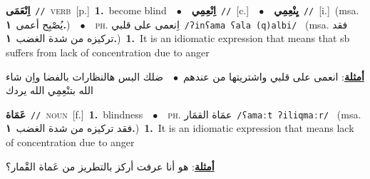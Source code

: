 \documentclass[10pt,a4paper,twoside]{article} %
\begin{document}
\begin{multicols}{2}
{\setlength\topsep{0pt}\textbf{\foreignlanguage{arabic}{اِنْعَمَى}}\ {\color{gray}\texttt{//}\color{black}}\ \textsc{verb}\ [p.]\ \textbf{1.}~become blind\ \ $\bullet$\ \ \setlength\topsep{0pt}\textbf{\foreignlanguage{arabic}{اِنْعِمِي}}\ {\color{gray}\texttt{//}\color{black}}\ [c.]\ \ $\bullet$\ \ \setlength\topsep{0pt}\textbf{\foreignlanguage{arabic}{يِنْعِمِي}}\ {\color{gray}\texttt{//}\color{black}}\ [i.]\ \color{gray}(msa. \foreignlanguage{arabic}{يُصْبِح أعمى}~\foreignlanguage{arabic}{\textbf{١.}})\color{black}\ \ $\bullet$\ \ \textsc{ph.} \color{gray} \foreignlanguage{arabic}{اِنعمى على قلبي}\color{black}\ {\color{gray}\texttt{/{\sffamily ʔinʕama ʕala (q)albi}/}\color{black}}\ \color{gray} (msa. \foreignlanguage{arabic}{فقد تركيزه من شدة الغضب}~\foreignlanguage{arabic}{\textbf{١.}})\color{black}\ \textbf{1.}~It is an idiomatic expression that means that sb suffers from lack of concentration due to anger\  \begin{flushright}\color{gray}\foreignlanguage{arabic}{\textbf{\underline{\foreignlanguage{arabic}{أمثلة}}}: انعمى على قلبي واشتريتها من عندهم\ $\bullet$\ \  ضلك البس هالنظارات بالفضا واِن شاء الله بتنْعِمِي الله يردك}\end{flushright}\color{black}} \vspace{2mm}

{\setlength\topsep{0pt}\textbf{\foreignlanguage{arabic}{عَمَاة}}\ {\color{gray}\texttt{//}\color{black}}\ \textsc{noun}\ [f.]\ \textbf{1.}~blindness\ \ $\bullet$\ \ \textsc{ph.} \color{gray} \foreignlanguage{arabic}{عمَاة القمَار}\color{black}\ {\color{gray}\texttt{/{\sffamily ʕamaːt ʔiliqmaːr}/}\color{black}}\ \color{gray} (msa. \foreignlanguage{arabic}{فقد تركيزه من شدة الغضب}~\foreignlanguage{arabic}{\textbf{١.}})\color{black}\ \textbf{1.}~It is an idiomatic expression that means lack of concentration due to anger\  \begin{flushright}\color{gray}\foreignlanguage{arabic}{\textbf{\underline{\foreignlanguage{arabic}{أمثلة}}}: هو أنا عرفت أركز بالتطريز من عَماة القْمار؟}\end{flushright}\color{black}} \vspace{2mm}


\end{multicols}
\end{document}
